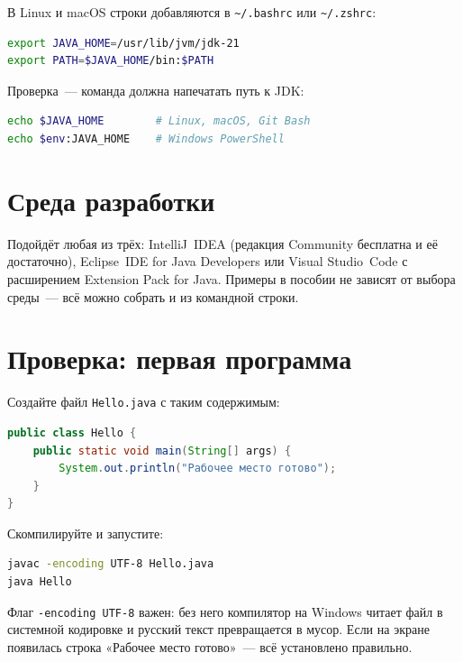 В Linux и macOS строки добавляются в \texttt{\textasciitilde/.bashrc} или
\texttt{\textasciitilde/.zshrc}:

\begin{lstlisting}[language=bash,caption={Настройка JAVA\_HOME в Linux и macOS},label={lst:app-nixenv}]
export JAVA_HOME=/usr/lib/jvm/jdk-21
export PATH=$JAVA_HOME/bin:$PATH
\end{lstlisting}

Проверка~--- команда должна напечатать путь к JDK:

\begin{lstlisting}[language=bash,caption={Проверка JAVA\_HOME},label={lst:app-checkenv}]
echo $JAVA_HOME        # Linux, macOS, Git Bash
echo $env:JAVA_HOME    # Windows PowerShell
\end{lstlisting}

\section{Среда разработки}

Подойдёт любая из трёх: IntelliJ~IDEA (редакция Community бесплатна и её
достаточно), Eclipse~IDE for Java Developers или Visual Studio~Code с расширением
Extension Pack for Java. Примеры в пособии не зависят от выбора среды~--- всё
можно собрать и из командной строки.

\section{Проверка: первая программа}

Создайте файл \texttt{Hello.java} с таким содержимым:

\begin{lstlisting}[language=Java,caption={Проверочная программа},label={lst:app-hello}]
public class Hello {
    public static void main(String[] args) {
        System.out.println("Рабочее место готово");
    }
}
\end{lstlisting}

Скомпилируйте и запустите:

\begin{lstlisting}[language=bash,caption={Сборка и запуск},label={lst:app-run}]
javac -encoding UTF-8 Hello.java
java Hello
\end{lstlisting}

Флаг \texttt{-encoding UTF-8} важен: без него компилятор на Windows читает файл
в системной кодировке и русский текст превращается в мусор. Если на экране
появилась строка «Рабочее место готово»~--- всё установлено правильно.

